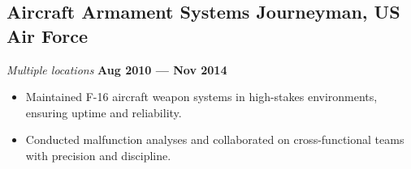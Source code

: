 \documentclass[a4paper,10pt]{article}
\begin{document}
\subsection*{Aircraft Armament Systems Journeyman, US Air Force}
\textit{Multiple locations} \hfill \textbf{Aug 2010 — Nov 2014}
\begin{itemize}[leftmargin=1.5em]
    \item Maintained F-16 aircraft weapon systems in high-stakes environments, ensuring uptime and reliability.
    \item Conducted malfunction analyses and collaborated on cross-functional teams with precision and discipline.
\end{itemize}
\end{document}
